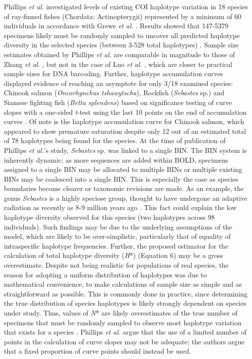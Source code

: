 Phillips \textit{et al.} \cite{phillips2015exploration} investigated levels of existing COI haplotype variation in 18 species of ray-finned fishes (Chordata: Actinopterygii) represented by a minimum of 60 individuals in accordance with Grewe \textit{et al.} \cite{grewe1993mitochondrial}. Results showed that 147-5379 specimens likely must be randomly sampled to uncover all predicted haplotype diversity in the selected species (between 3-528 total haplotypes) \cite{phillips2015exploration}. Sample size estimates obtained by Phillips \textit{et al.} \cite{phillips2015exploration} are comparable in magnitude to those of Zhang \textit{et al.} \cite{zhang2010estimating}, but not in the case of Luo \textit{et al.} \cite{luo2015simulation}, which are closer to practical sample sizes for DNA barcoding. Further, haplotype accumulation curves displayed evidence of reaching an asymptote for only 3/18 examined species: Chinook salmon (\textit{Oncorhynchus tshawytscha}), Rockfish (\textit{Sebastes} sp.) and Siamese fighting fish (\textit{Betta splendens}) based on significance testing of curve slopes with a one-sided \textit{t}-test using the last 10 points on the end of accumulation curves \cite{phillips2015exploration}. Of note is the haplotype accumulation curve for Chinook salmon, which appeared to show premature saturation despite only 12 out of an estimated total of 78 haplotypes being found for the species. At the time of publication of Phillips \textit{et al.}'s \cite{phillips2015exploration} study, \textit{Sebastes} sp. was linked to a single BIN. The BIN system is inherently dynamic: as more sequences are added within BOLD, specimens assigned to a single BIN may be allocated to multiple BINs or multiple existing BINs may be coalesced into a single BIN. This is especially the case as species boundaries become clearer or taxonomic revisions are made. As an example, the genus \textit{Sebastes} is a highly speciose group, thought to have undergone an adaptive radiation as recently as 8-9 million years ago \cite{steinke2009dna}. This fact could explain the low haplotype diversity observed for this species (two haplotypes across 98 individuals). Such findings may be due to the underlying assumptions of the model, which are likely to be over-simplistic, particularly that of equality of intraspecific haplotype frequencies. Further, the proposed estimator for the calculation of total haplotype diversity (\textit{H}*) (Equation 6) may be a gross overestimate. Despite not being realistic for populations of real species, the reason for adopting a uniform distribution of haplotypes was due to mathematical convenience, to make calculations of sample size as simple and as straightforward as possible. This is commonly done in practice, since determining the true distribution of species haplotypes is likely strongly dependent on species under study. Thus, values of \textit{N}* are likely overestimates of the true number of specimens that must be randomly sampled to observe most haplotype variation that exists for a species \cite{phillips2015exploration}. Phillips \textit{et al.} \cite{phillips2015exploration} argue that the use of a limited number of points in the calculation of curve slopes may not be adequate; the authors argue that a fixed proportion of curve points should instead be used. 